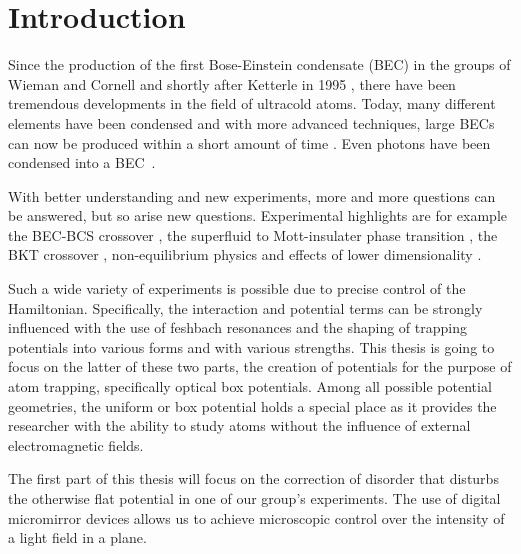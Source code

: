 

\chapter{Introduction}
\label{cha:introduction}

Since the production of the first Bose-Einstein condensate (BEC) in the groups of Wieman and Cornell and shortly after Ketterle in 1995 \cite{bec1,bec2}, there have been tremendous developments in the field of ultracold atoms. Today, many different elements have been condensed \cite{PhysRevLett.78.985,PhysRevLett.81.3811,PhysRevLett.85.1795,Modugno1320,PhysRevLett.86.3459,PhysRevLett.91.040404,Weber232,PhysRevLett.94.160401,PhysRevLett.103.130401,PhysRevA.82.011608,PhysRevLett.108.210401,PhysRevLett.107.190401} and with more advanced techniques, large BECs can now be produced within a short amount of time \cite{Rudolph2015,PhysRevA.95.013609}. Even photons have been condensed into a BEC~\cite{photonbec}.

With better understanding and new experiments, more and more questions can be answered, but so arise new questions. Experimental highlights are for example the BEC-BCS crossover \cite{PhysRevLett.92.120403,PhysRevLett.92.040403}, the superfluid to Mott-insulater phase transition \cite{mottInsulator}, the BKT crossover \cite{bktCrossover}, non-equilibrium physics \cite{nonEquilibrium} and effects of lower dimensionality \cite{oneDim1,oneDim2}.

Such a wide variety of experiments is possible due to precise control of the Hamiltonian. Specifically, the interaction and potential terms can be strongly influenced with the use of feshbach resonances \cite{RevModPhys.82.1225} and the shaping of trapping potentials into various forms and with various strengths.
This thesis is going to focus on the latter of these two parts, the creation of potentials for the purpose of atom trapping, specifically optical box potentials. Among all possible potential geometries, the uniform or box potential holds a special place as it provides the researcher with the ability to study atoms without the influence of external electromagnetic fields.

\vspace{1ex}
\noindent
The first part of this thesis will focus on the correction of disorder that disturbs the otherwise flat potential in one of our group's experiments. The use of digital micromirror devices allows us to achieve microscopic control over the intensity of a light field in a plane.

